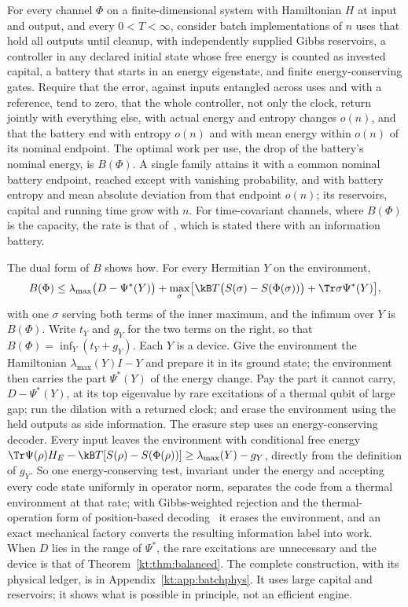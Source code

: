 \begin{theorem}\label{kt:thm:batchlaw}
For every channel $\Phi$ on a finite-dimensional system with Hamiltonian $H$ at input and output, and every $0<T<\infty$, consider batch implementations of $n$ uses that hold all outputs until cleanup, with independently supplied Gibbs reservoirs, a controller in any declared initial state whose free energy is counted as invested capital, a battery that starts in an energy eigenstate, and finite energy-conserving gates. Require that the error, against inputs entangled across uses and with a reference, tend to zero, that the whole controller, not only the clock, return jointly with everything else, with actual energy and entropy changes $o(n)$, and that the battery end with entropy $o(n)$ and with mean energy within $o(n)$ of its nominal endpoint. The optimal work per use, the drop of the battery's nominal energy, is $B(\Phi)$. A single family attains it with a common nominal battery endpoint, reached except with vanishing probability, and with battery entropy and mean absolute deviation from that endpoint $o(n)$; its reservoirs, capital and running time grow with $n$. For time-covariant channels, where $B(\Phi)$ is the capacity, the rate is that of~\cite[Thm.~7.1]{FBB21}, which is stated there with an information battery.
\end{theorem}

The dual form of $B$ shows how. For every Hermitian $Y$ on the environment,
\[
B(\Phi)\le\lambda_{\max}\bigl(D-\Psi^*(Y)\bigr)+\max_\sigma\bigl[\kB T\bigl(S(\sigma)-S(\Phi(\sigma))\bigr)+\Tr\sigma\Psi^*(Y)\bigr],
\]
with one $\sigma$ serving both terms of the inner maximum, and the infimum over $Y$ is $B(\Phi)$. Write $t_Y$ and $g_Y$ for the two terms on the right, so that $B(\Phi)=\inf_Y(t_Y+g_Y)$. Each $Y$ is a device. Give the environment the Hamiltonian $\lambda_{\max}(Y)I-Y$ and prepare it in its ground state; the environment then carries the part $\Psi^*(Y)$ of the energy change. Pay the part it cannot carry, $D-\Psi^*(Y)$, at its top eigenvalue by rare excitations of a thermal qubit of large gap; run the dilation with a returned clock; and erase the environment using the held outputs as side information. The erasure step uses an energy-conserving decoder. Every input leaves the environment with conditional free energy $\Tr\Psi(\rho)H_E-\kB T[S(\rho)-S(\Phi(\rho))]\ge\lambda_{\max}(Y)-g_Y$, directly from the definition of $g_Y$. So one energy-conserving test, invariant under the energy and accepting every code state uniformly in operator norm, separates the code from a thermal environment at that rate; with Gibbs-weighted rejection and the thermal-operation form of position-based decoding~\cite{AnshuJainWarsi19,FBB21} it erases the environment, and an exact mechanical factory converts the resulting information label into work. When $D$ lies in the range of $\Psi^*$, the rare excitations are unnecessary and the device is that of Theorem~\ref{kt:thm:balanced}. The complete construction, with its physical ledger, is in Appendix~\ref{kt:app:batchphys}. It uses large capital and reservoirs; it shows what is possible in principle, not an efficient engine.

